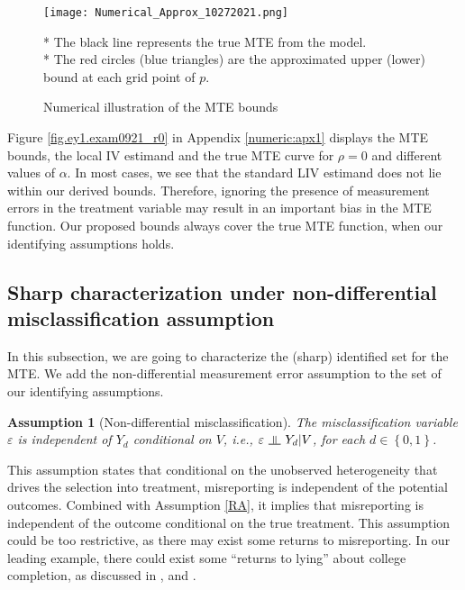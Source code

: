 \documentclass[11pt,reqno]{amsart}
\newcommand{\indep}{\rotatebox[origin=c]{90}{$\models$}}
\theoremstyle{plain}
\newtheorem{assumption}{Assumption}
\numberwithin{equation}{section}
\begin{document}
\begin{figure}[h]
    \texttt{[image: Numerical\_Approx\_10272021.png]}\\
    \begin{flushleft}
	\footnotesize{* The black line represents the true MTE from the model.}\\
    \footnotesize{* The red circles (blue triangles) are the approximated upper (lower) bound at each grid point of $p$.}\\
    \end{flushleft}
    \centering \caption{Numerical illustration of the MTE bounds}
	\label{fig.ey1.exam0921}
\end{figure}

Figure \ref{fig.ey1.exam0921_r0} in Appendix \ref{numeric:apx1} displays the MTE bounds, the local IV estimand and the true MTE curve for $\rho=0$ and different values of $\alpha$. In most cases, we see that the standard LIV estimand does not lie within our derived bounds. Therefore, ignoring the presence of measurement errors in the treatment variable may result in an important bias in the MTE function. Our proposed bounds always cover the true MTE function, when our identifying assumptions holds.

\clearpage

\subsection{Sharp characterization under non-differential misclassification assumption} In this subsection, we are going to characterize the (sharp) identified set for the MTE. We add the non-differential measurement error assumption to the set of our identifying assumptions.
\begin{assumption}[Non-differential misclassification]\label{NDE}
The misclassification variable $\varepsilon$ is independent of $Y_d$ conditional on $V$, i.e., $\varepsilon\ \indep\ Y_d \vert V$, for each $d\in \left\{0,1\right\}$.
\end{assumption}
This assumption states that conditional on the unobserved heterogeneity that drives the selection into treatment, misreporting is independent of the potential outcomes. Combined with Assumption \ref{RA}, it implies that misreporting is independent of the outcome conditional on the true treatment. This assumption could be too restrictive, as there may exist some returns to misreporting. In our leading example, there could exist some ``returns to lying'' about college completion, as discussed in \cite{HuLewbel2012}, and \cite{DiTraglia2019}.
\end{document}
